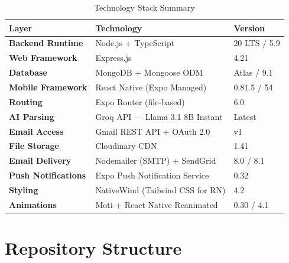\documentclass[12pt,a4paper]{report}
\begin{document}
\begin{table}[H]
\centering
{}
\begin{tabularx}{\textwidth}{>{\bfseries}l X l}
\rowcolor{tableheadbg}
\color{white}Layer & \color{white}Technology & \color{white}Version \\
\toprule
Backend Runtime  & Node.js + TypeScript                    & 20 LTS / 5.9 \\
Web Framework    & Express.js                              & 4.21 \\
Database         & MongoDB + Mongoose ODM                  & Atlas / 9.1 \\
Mobile Framework & React Native (Expo Managed)             & 0.81.5 / 54 \\
Routing          & Expo Router (file-based)                & 6.0 \\
AI Parsing       & Groq API — Llama 3.1 8B Instant         & Latest \\
Email Access     & Gmail REST API + OAuth 2.0              & v1 \\
File Storage     & Cloudinary CDN                          & 1.41 \\
Email Delivery   & Nodemailer (SMTP) + SendGrid            & 8.0 / 8.1 \\
Push Notifications & Expo Push Notification Service        & 0.32 \\
Styling          & NativeWind (Tailwind CSS for RN)        & 4.2 \\
Animations       & Moti + React Native Reanimated          & 0.30 / 4.1 \\
\bottomrule
\end{tabularx}
\caption{Technology Stack Summary}
\end{table}

\section{Repository Structure}
\end{document}
